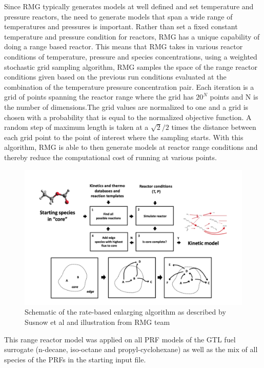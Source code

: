 Since RMG typically generates models at well defined and set temperature and pressure reactors, the need to generate models that span a wide range of temperatures and pressures is important. Rather than set a fixed constant temperature and pressure condition for reactors, RMG has a unique capability of doing a range based reactor. This means that RMG takes in various reactor conditions of temperature, pressure and species concentrations, using a weighted stochastic grid sampling algorithm, RMG samples the space of the range reactor conditions given based on the previous run conditions evaluated at the combination of the temperature pressure concentration pair. Each iteration is a grid of points spanning the reactor range where the grid has $20^N$ points and N is the number of dimensions.The grid values are normalized to one and a grid is chosen with a probability that is equal to the normalized objective function. A random step of maximum length is taken at a $\sqrt{2}/2$ times the distance between each grid point to the point of interest where the sampling starts. With this algorithm, RMG is able to then generate models at reactor range conditions and thereby reduce the computational cost of running at various points. 

\begin{figure}[ht]
    \centering
    \includegraphics[scale=0.45,keepaspectratio]{images/rate-schematic.png}
    \caption{Schematic of the rate-based enlarging algorithm as described by Susnow et al\cite{Susnow1997Rate-BasedSystems} and illustration from RMG team\cite{Gao2016ReactionMechanisms}}
    \label{fig:rate-schematic}
\end{figure}


This range reactor model was applied on all PRF models of the GTL fuel surrogate (n-decane, iso-octane and propyl-cyclohexane) as well as the mix of all species of the PRFs in the starting input file.


